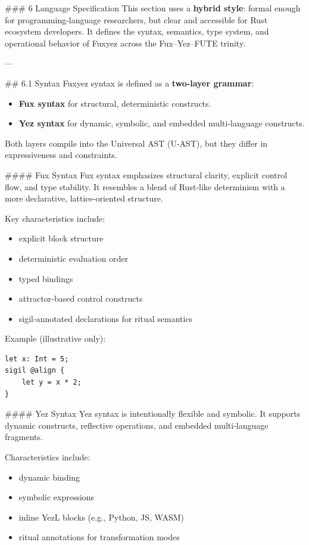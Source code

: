     
    \#\#\# 6 Language Specification  
This section uses a \textbf{hybrid style}: formal enough for programming‑language researchers, but clear and accessible for Rust ecosystem developers. It defines the syntax, semantics, type system, and operational behavior of Fuxyez across the Fux–Yez–FUTE trinity.

---

\#\# 6.1 Syntax  
Fuxyez syntax is defined as a \textbf{two‑layer grammar}:  
\begin{itemize}
  \item \textbf{Fux syntax} for structural, deterministic constructs.  
  \item \textbf{Yez syntax} for dynamic, symbolic, and embedded multi‑language constructs.
\end{itemize}

Both layers compile into the Universal AST (U‑AST), but they differ in expressiveness and constraints.

\#\#\#\# Fux Syntax  
Fux syntax emphasizes structural clarity, explicit control flow, and type stability. It resembles a blend of Rust‑like determinism with a more declarative, lattice‑oriented structure.

Key characteristics include:  
\begin{itemize}
  \item explicit block structure  
  \item deterministic evaluation order  
  \item typed bindings  
  \item attractor‑based control constructs  
  \item sigil‑annotated declarations for ritual semantics
\end{itemize}

Example (illustrative only):  
\begin{lstlisting}[language=fuxyez]
let x: Int = 5;
sigil @align {
    let y = x * 2;
}

\end{lstlisting}

\#\#\#\# Yez Syntax  
Yez syntax is intentionally flexible and symbolic. It supports dynamic constructs, reflective operations, and embedded multi‑language fragments.

Characteristics include:  
\begin{itemize}
  \item dynamic binding  
  \item symbolic expressions  
  \item inline YezL blocks (e.g., Python, JS, WASM)  
  \item ritual annotations for transformation modes
\end{itemize}

